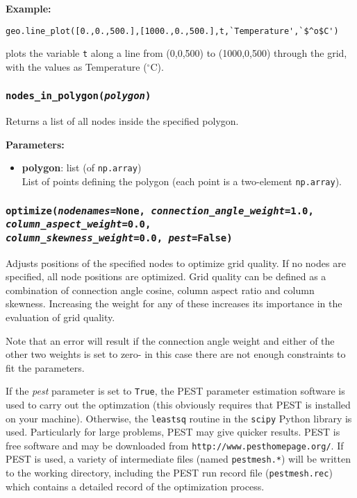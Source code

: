 \textbf{Example:}

\begin{verbatim}
geo.line_plot([0.,0.,500.],[1000.,0.,500.],t,`Temperature',`$^o$C')
\end{verbatim}

plots the variable \texttt{t} along a line from (0,0,500) to (1000,0,500) through the grid, with the values as Temperature ($^{\circ}$C).

\subsubsection{\texttt{nodes\_in\_polygon(\emph{polygon})}}

Returns a list of all nodes inside the specified polygon.

\textbf{Parameters:}
\begin{itemize}
\item \textbf{polygon}: list (of \texttt{np.array})\\
  List of points defining the polygon (each point is a two-element \texttt{np.array}).
\end{itemize}

\subsubsection{\texttt{optimize(\emph{nodenames}=None, \emph{connection\_angle\_weight}=1.0, \emph{column\_aspect\_weight}=0.0,\\
    \emph{column\_skewness\_weight}=0.0, \emph{pest}=False)}}

Adjusts positions of the specified nodes to optimize grid quality.  If no nodes are specified, all node positions are optimized.  Grid quality can be defined as a combination of connection angle cosine, column aspect ratio and column skewness.  Increasing the weight for any of these increases its importance in the evaluation of grid quality.

Note that an error will result if the connection angle weight and either of the other two weights is set to zero- in this case there are not enough constraints to fit the parameters.

If the \emph{pest} parameter is set to \texttt{True}, the PEST parameter estimation software is used to carry out the optimzation (this obviously requires that PEST is installed on your machine).  Otherwise, the \texttt{leastsq} routine in the \texttt{scipy} Python library is used.  Particularly for large problems, PEST may give quicker results.  PEST is free software and may be downloaded from \texttt{http://www.pesthomepage.org/}.  If PEST is used, a variety of intermediate files (named \texttt{pestmesh.*}) will be written to the working directory, including the PEST run record file (\texttt{pestmesh.rec}) which contains a detailed record of the optimization process.

